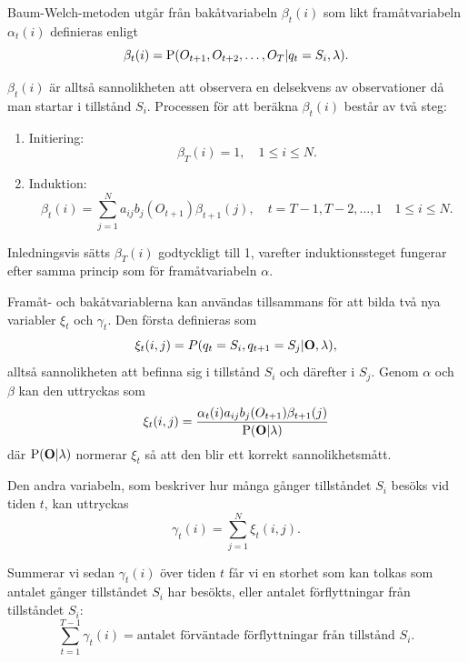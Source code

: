 \documentclass[../rapport_MVEX01-11-05]{subfiles}
\begin{document}
Baum-Welch-metoden utgår från bakåtvariabeln $\beta_t(i)$ som likt
framåtvariabeln $\alpha_t(i)$ definieras enligt
\begin{equation*}
\beta_t(i) = \mathrm{P}(O_{t+1},O_{t+2},\dots,O_T | q_t = S_i, \lambda).
\end{equation*} 

$\beta_t(i)$ är alltså sannolikheten att observera en delsekvens av
observationer då man startar i tillstånd $S_i$. Processen för att beräkna $\beta_t(i)$ består av två steg:
\begin{enumerate}
\item Initiering: 
\begin{equation*}
\beta_T(i) = 1, \quad 1 \leq i \leq N.
\end{equation*}
\item Induktion: 
\begin{equation*}
\beta_t(i) = \sum\limits_{j=1}^Na_{ij}b_j(O_{t+1})\beta_{t+1}(j), \quad t =
T-1,T-2,\dots,1 \quad 1 \leq i \leq N.
\end{equation*}
\end{enumerate}

Inledningsvis sätts $\beta_T(i)$ godtyckligt till 1, varefter
induktionssteget fungerar efter samma princip som för framåtvariabeln
$\alpha$.

Framåt- och bakåtvariablerna kan användas tillsammans
för att bilda två nya variabler $\xi_t$ och $\gamma_t$.
Den första definieras som 
\begin{equation*}
\xi_t(i,j) = P(q_t = S_i, q_{t+1} = S_j|\mathbf{O},\lambda),
\end{equation*}
alltså sannolikheten att befinna sig i tillstånd $S_i$ och
därefter i $S_j$. Genom $\alpha$ och $\beta$ kan den uttryckas som
\begin{equation*}
\xi_t(i,j) = \frac{\alpha_t(i)a_{ij}b_j(O_{t+1})\beta_{t+1}(j)}{\mathrm{P}(\mathbf{O}|\lambda)}
\end{equation*} 
där $\mathrm{P}(\mathbf{O}|\lambda)$ normerar $\xi_t$ så att den blir ett korrekt
sannolikhetsmått.

Den andra variabeln, som beskriver hur många gånger tillståndet $S_i$ besöks
vid tiden $t$, kan uttryckas
\begin{equation*}
\gamma_t(i) = \sum_{j=1}^N\xi_t(i,j).
\end{equation*}

Summerar vi sedan $\gamma_t(i)$ över tiden $t$ får vi en storhet
som kan tolkas som antalet gånger tillståndet $S_i$ har besökts,
eller antalet förflyttningar från tillståndet $S_i$:
\begin{equation*}
\sum_{t=1}^{T-1}\gamma_t(i) = \text{antalet förväntade förflyttningar
  från tillstånd $S_i$.}
\end{equation*} 
\end{document}
